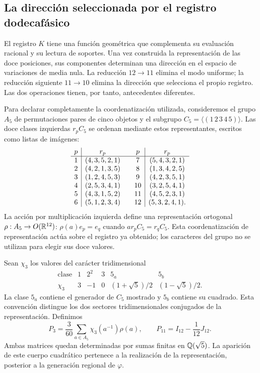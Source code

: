 \subsection{La dirección seleccionada por el registro dodecafásico}
\label{exc:k-direccion}

El registro \(K\) tiene una función geométrica que complementa su
evaluación racional y su lectura de soportes. Una vez construida la
representación de las doce posiciones, sus componentes determinan una
dirección en el espacio de variaciones de media nula. La reducción
\(12\to11\) elimina el modo uniforme; la reducción siguiente
\(11\to10\) elimina la dirección que selecciona el propio registro.
Las dos operaciones tienen, por tanto, antecedentes diferentes.

Para declarar completamente la coordenatización utilizada, consideremos el grupo
\(A_5\) de permutaciones pares de cinco objetos y el subgrupo
\(C_5=\langle(1\,2\,3\,4\,5)\rangle\). Las doce clases izquierdas
\(r_pC_5\) se ordenan mediante estos representantes, escritos como
listas de imágenes:
\[
\begin{array}{c|c@{\qquad}c|c}
p&r_p&p&r_p\\ \hline
1&(4,3,5,2,1)&7&(5,4,3,2,1)\\
2&(4,2,1,3,5)&8&(1,3,4,2,5)\\
3&(1,2,4,5,3)&9&(4,2,3,5,1)\\
4&(2,5,3,4,1)&10&(3,2,5,4,1)\\
5&(4,3,1,5,2)&11&(4,5,2,3,1)\\
6&(5,1,2,3,4)&12&(5,3,2,4,1).
\end{array}
\]
La acción por multiplicación izquierda define una representación
ortogonal \(\rho:A_5\to O(\mathbb R^{12})\):
\(\rho(a)e_p=e_q\) cuando \(ar_pC_5=r_qC_5\).
Esta coordenatización de representación actúa sobre el registro ya obtenido;
los caracteres del grupo no se utilizan para elegir sus doce valores.

Sean \(\chi_3\) los valores del carácter tridimensional
\[
\begin{array}{c|ccccc}
\text{clase}&1&2^2&3&5_a&5_b\\ \hline
\chi_3&3&-1&0&(1+\sqrt5)/2&(1-\sqrt5)/2.
\end{array}
\]
La clase \(5_a\) contiene el generador de \(C_5\) mostrado y
\(5_b\) contiene su cuadrado. Esta convención distingue los dos
sectores tridimensionales conjugados de la representación. Definimos
\begin{equation}
 P_3=\frac3{60}\sum_{a\in A_5}\chi_3(a^{-1})\rho(a),
 \qquad P_{11}=I_{12}-\frac1{12}J_{12}.
 \label{eq:k-proyectores-incidencia}
\end{equation}
Ambas matrices quedan determinadas por sumas finitas en
\(\mathbb Q(\sqrt5)\). La aparición de este cuerpo cuadrático pertenece
a la realización de la representación, posterior a la generación
regional de \(\varphi\).

